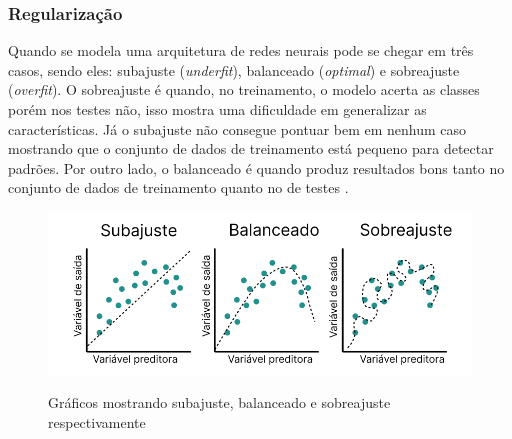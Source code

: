 \subsubsection*{Regularização}

Quando se modela uma arquitetura de redes neurais pode se chegar em três casos, sendo eles: subajuste (\textit{underfit}), balanceado (\textit{optimal}) e sobreajuste (\textit{overfit}). O sobreajuste é quando, no treinamento, o modelo acerta as classes porém nos testes não, isso mostra uma dificuldade em generalizar as características. Já o subajuste não consegue pontuar bem em nenhum caso mostrando que o conjunto de dados de treinamento está pequeno para detectar padrões. Por outro lado,  o balanceado é quando produz resultados bons tanto no conjunto de dados de treinamento quanto no de testes \space\cite{Alzubaidi2021, computation11030052}.

\begin{figure}[ht]
	\caption{Gráficos mostrando subajuste, balanceado e sobreajuste respectivamente}
	\centering %
	\includegraphics[width=15cm]{figures/fittings.png} %
	\label{fig:fittings}
\end{figure}
